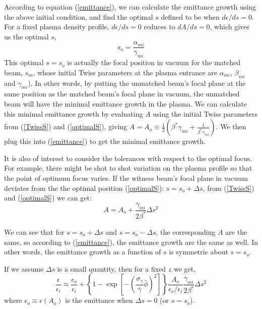 \documentclass[%
reprint, superscriptaddress,
 amsmath,amssymb, aps,
prstab,
]{revtex4-2}
\begin{document}
 According to equation (\ref{emittance}), we can calculate the emittance
growth using the above initial condition, and find the
optimal $s$ defined to be when $d\epsilon/ds = 0$. For a fixed plasma density
profile, $d\epsilon/ds = 0$ reduces to $dA/ds = 0$, which gives
us the optimal $s$, \begin{equation} s_o =
\frac{\alpha_{mi}}{\gamma_{mi}} \label{optimalS} \end{equation} 
This optimal $s = s_o$ is actually the focal
position in vacuum for the matched beam, $s_m$,  whose initial Twiss parameters at the plasma entrance
are $\alpha_{mi}$, $\beta_{mi}$ and $\gamma_{mi}$).  In other words, by
putting the unmatched beam's focal plane at the same position as the
matched beam's focal plane in vacuum, the unmatched beam will have the
minimal emittance growth in the plasma. We can calculate this minimal emittance growth by 
evaluating $A$ using the initial Twiss parameters from (\ref{TwissS}) and (\ref{optimalS}), giving
$A = A_o \equiv \frac{1}{2}(\beta^* \gamma_{mi} +\frac{1}{\beta^* \gamma_{mi}}) $. We then plug this into (\ref{emittance})
to get the minimal emittance growth.

It is also of interest to consider the tolerances with respect to the optimal focus. For example, there might be shot to shot variation on the plasma profile so that the point of optimum focus varies. If the witness beam's focal plane in vacuum deviates from the the optimal position (\ref{optimalS}): $s = s_o + \Delta s$, from (\ref{TwissS}) and (\ref{optimalS}) we can get:
\[
A= A_o + \frac{\gamma_{mi}}{2 \beta^*} \Delta s^2
\]


We can see that for $s = s_o + \Delta s$ and $s = s_o - \Delta s$, the corresponding $A$ are the same, so according to (\ref{emittance}), the emittance growth are the same as well. In other words, the emittance growth as a function of $s$ is symmetric about $s=s_o$.

If we assume $\Delta s$ is a small quantity, then for a fixed $z$ we get,
\[
\frac{\epsilon}{\epsilon_i} \approx \frac{\epsilon_o}{\epsilon_i} + \left \{1 - \exp[-(\frac{\sigma_\gamma}{\bar \gamma}\bar \phi)^2] \right \}\frac{A_o}{\epsilon_o / \epsilon_i} \frac{\gamma_{mi}}{2\beta^*}\Delta s^2
\]
where $\epsilon_o \equiv \epsilon(A_o)$ is the emittance when $\Delta s = 0$ (or $s = s_o$). 
\end{document}
